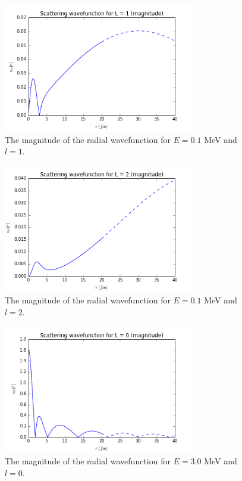 \documentclass[]{scrartcl}
\begin{document}
\begin{figure}
\centering
	\includegraphics[width=0.75\textwidth]{figures/E01/magnitude1.png}
	\caption{The magnitude of the radial wavefunction for $E = 0.1$ MeV and $l=1$.}
	\label{fig:e01l1}
\end{figure}

\begin{figure}
\centering
	\includegraphics[width=0.75\textwidth]{figures/E01/magnitude2.png}
	\caption{The magnitude of the radial wavefunction for $E = 0.1$ MeV and $l=2$.}
	\label{fig:e01l2}
\end{figure}


\begin{figure}
\centering
	\includegraphics[width=0.75\textwidth]{figures/E30/magnitude0.png}
	\caption{The magnitude of the radial wavefunction for $E = 3.0$ MeV and $l=0$.}
	\label{fig:e01l0}
\end{figure}
\end{document}
